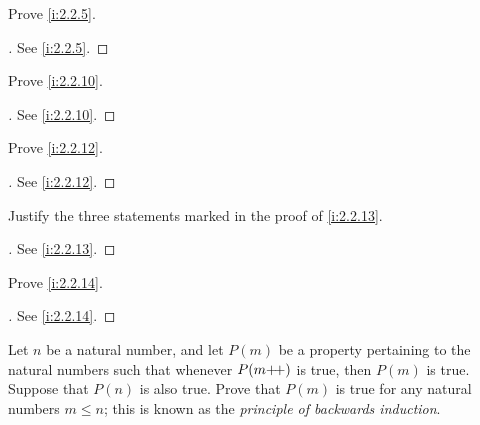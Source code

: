 \exercisesection

\begin{ex}\label{i:ex:2.2.1}
  Prove \cref{i:2.2.5}.
\end{ex}

\begin{proof}[]
  See \cref{i:2.2.5}.
\end{proof}

\begin{ex}\label{i:ex:2.2.2}
  Prove \cref{i:2.2.10}.
\end{ex}

\begin{proof}[]
  See \cref{i:2.2.10}.
\end{proof}

\begin{ex}\label{i:ex:2.2.3}
  Prove \cref{i:2.2.12}.
\end{ex}

\begin{proof}[]
  See \cref{i:2.2.12}.
\end{proof}

\begin{ex}\label{i:ex:2.2.4}
  Justify the three statements marked in the proof of \cref{i:2.2.13}.
\end{ex}

\begin{proof}[]
  See \cref{i:2.2.13}.
\end{proof}

\begin{ex}\label{i:ex:2.2.5}
  Prove \cref{i:2.2.14}.
\end{ex}

\begin{proof}[]
  See \cref{i:2.2.14}.
\end{proof}

\begin{ex}\label{i:ex:2.2.6}
  Let \(n\) be a natural number, and let \(P(m)\) be a property pertaining to the natural numbers such that whenever \(P(m{+}\!{+})\) is true, then \(P(m)\) is true.
  Suppose that \(P(n)\) is also true.
  Prove that \(P(m)\) is true for any natural numbers \(m \leq n\);
  this is known as the \emph{principle of backwards induction}.
\end{ex}

